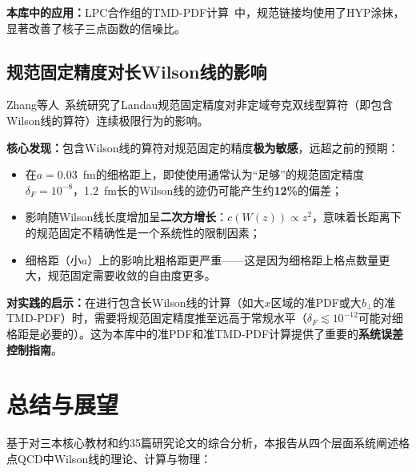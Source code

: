 \documentclass[12pt,a4paper]{ctexart}
\theoremstyle{definition}
\begin{document}
\textbf{本库中的应用：}LPC合作组的TMD-PDF计算~\cite{He2024unpolTMD}中，规范链接均使用了HYP涂抹，显著改善了核子三点函数的信噪比。

\subsection{规范固定精度对长Wilson线的影响}

Zhang等人~\cite{Zhang2024gauge_fixing}系统研究了Landau规范固定精度对非定域夸克双线型算符（即包含Wilson线的算符）连续极限行为的影响。

\textbf{核心发现：}包含Wilson线的算符对规范固定的精度\textbf{极为敏感}，远超之前的预期：
\begin{itemize}
    \item 在$a = 0.03$~fm的细格距上，即使使用通常认为``足够''的规范固定精度$\delta_F = 10^{-8}$，1.2~fm长的Wilson线的迹仍可能产生约\textbf{12\%}的偏差；
    \item 影响随Wilson线长度增加呈\textbf{二次方增长}：$c(W(z)) \propto z^2$，意味着长距离下的规范固定不精确性是一个系统性的限制因素；
    \item 细格距（小$a$）上的影响比粗格距更严重——这是因为细格距上格点数量更大，规范固定需要收敛的自由度更多。
\end{itemize}

\textbf{对实践的启示：}在进行包含长Wilson线的计算（如大$x$区域的准PDF或大$b_\perp$的准TMD-PDF）时，需要将规范固定精度推至远高于常规水平（$\delta_F \lesssim 10^{-12}$可能对细格距是必要的）。这为本库中的准PDF和准TMD-PDF计算提供了重要的\textbf{系统误差控制指南}。

\section{总结与展望}

基于对三本核心教材和约35篇研究论文的综合分析，本报告从四个层面系统阐述格点QCD中Wilson线的理论、计算与物理：
\end{document}
